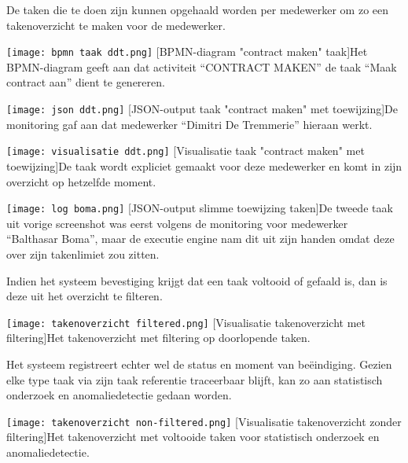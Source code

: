 De taken die te doen zijn kunnen opgehaald worden per medewerker om zo een takenoverzicht te maken voor de medewerker.

\begin{center}
  \captionsetup{type=figure}
  \texttt{[image: bpmn taak ddt.png]}
  [BPMN-diagram "contract maken" taak]{Het BPMN-diagram geeft aan dat activiteit “CONTRACT MAKEN” de taak “Maak contract aan” dient te genereren.}
\end{center}

\begin{center}
  \captionsetup{type=figure}
  \texttt{[image: json ddt.png]}
  [JSON-output taak "contract maken" met toewijzing]{De monitoring gaf aan dat medewerker “Dimitri De Tremmerie” hieraan werkt.}
\end{center}

\begin{center}
  \captionsetup{type=figure}
  \texttt{[image: visualisatie ddt.png]}
  [Visualisatie taak "contract maken" met toewijzing]{De taak wordt expliciet gemaakt voor deze medewerker en komt in zijn overzicht op hetzelfde moment.}
\end{center}

\begin{center}
  \captionsetup{type=figure}
  \texttt{[image: log boma.png]}
  [JSON-output slimme toewijzing taken]{De tweede taak uit vorige screenshot was eerst volgens de monitoring voor medewerker “Balthasar Boma”, maar de executie engine nam dit uit zijn handen omdat deze over zijn takenlimiet zou zitten.}
\end{center}

Indien het systeem bevestiging krijgt dat een taak voltooid of gefaald is, dan is deze uit het overzicht te filteren.
 
\begin{center}
  \captionsetup{type=figure}
  \texttt{[image: takenoverzicht filtered.png]}
  [Visualisatie takenoverzicht met filtering]{Het takenoverzicht met filtering op doorlopende taken.}
\end{center}

Het systeem registreert echter wel de status en moment van beëindiging. Gezien elke type taak via zijn taak referentie traceerbaar blijft, kan zo aan statistisch onderzoek en anomaliedetectie gedaan worden.
 
\begin{center}
  \captionsetup{type=figure}
  \texttt{[image: takenoverzicht non-filtered.png]}
  [Visualisatie takenoverzicht zonder filtering]{Het takenoverzicht met voltooide taken voor statistisch onderzoek en anomaliedetectie.}
\end{center}